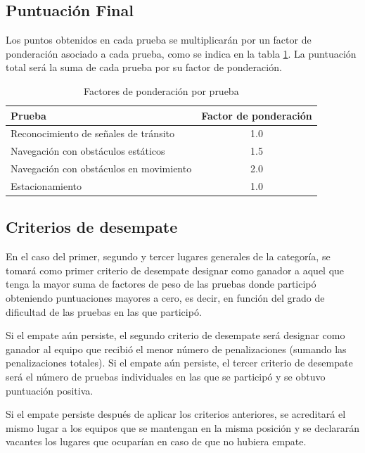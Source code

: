 \documentclass[letterpaper,12pt]{article}
\begin{document}
\subsection{Puntuación Final}
\label{sec:final_score}
Los puntos obtenidos en cada prueba se multiplicarán por un factor de ponderación asociado a cada prueba, como se indica en la tabla \ref{tab:weights}. La puntuación total será la suma de cada prueba por su factor de ponderación.

\begin{table}[h!]
  \centering
  \begin{tabular}{|l|c|}
    \hline
    Prueba & Factor de ponderación\\
    \hline
    Reconocimiento de señales de tránsito & 1.0 \\
    \hline
    Navegación con obstáculos estáticos & 1.5 \\
    \hline
    Navegación con obstáculos en movimiento & 2.0 \\
    \hline
    Estacionamiento & 1.0\\
    \hline
  \end{tabular}
  \caption{Factores de ponderación por prueba}
  \label{tab:weights}
\end{table}


\subsection{Criterios de desempate}
En el caso del primer, segundo y tercer lugares generales de la categoría, se tomará como primer criterio de desempate designar como ganador a aquel que tenga la mayor suma de factores de peso de las pruebas donde participó obteniendo puntuaciones mayores a cero, es decir, en función del grado de dificultad de las pruebas en las que participó.

Si el empate aún persiste, el segundo criterio de desempate será designar como ganador al equipo que recibió el menor número de penalizaciones (sumando las penalizaciones totales). Si el empate aún persiste, el tercer criterio de desempate será el número de pruebas individuales en las que se participó y se obtuvo puntuación positiva.

Si el empate persiste después de aplicar los criterios anteriores, se acreditará el mismo lugar a los equipos que se mantengan en la misma posición y se declararán vacantes los lugares que ocuparían en caso de que no hubiera empate.

\end{document}
